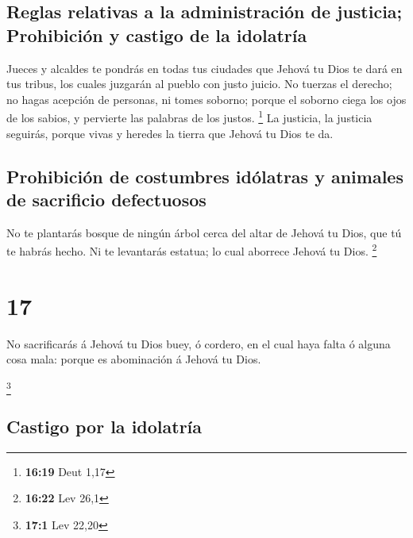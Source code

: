 \hypertarget{reglas-relativas-a-la-administraciuxf3n-de-justicia-prohibiciuxf3n-y-castigo-de-la-idolatruxeda}{%
\subsection{Reglas relativas a la administración de justicia;
Prohibición y castigo de la
idolatría}\label{reglas-relativas-a-la-administraciuxf3n-de-justicia-prohibiciuxf3n-y-castigo-de-la-idolatruxeda}}

 Jueces y alcaldes te pondrás en todas tus ciudades que
Jehová tu Dios te dará en tus tribus, los cuales juzgarán al pueblo con
justo juicio.  No tuerzas el derecho; no hagas acepción
de personas, ni tomes soborno; porque el soborno ciega los ojos de los
sabios, y pervierte las palabras de los justos. \footnote{\textbf{16:19}
  Deut 1,17}  La justicia, la justicia seguirás, porque
vivas y heredes la tierra que Jehová tu Dios te da.

\hypertarget{prohibiciuxf3n-de-costumbres-iduxf3latras-y-animales-de-sacrificio-defectuosos}{%
\subsection{Prohibición de costumbres idólatras y animales de sacrificio
defectuosos}\label{prohibiciuxf3n-de-costumbres-iduxf3latras-y-animales-de-sacrificio-defectuosos}}

 No te plantarás bosque de ningún árbol cerca del altar
de Jehová tu Dios, que tú te habrás hecho.  Ni te
levantarás estatua; lo cual aborrece Jehová tu Dios. \footnote{\textbf{16:22}
  Lev 26,1}

\hypertarget{section-16}{%
\section{17}\label{section-16}}

 No sacrificarás á Jehová tu Dios buey, ó cordero, en el
cual haya falta ó alguna cosa mala: porque es abominación á Jehová tu
Dios.

\footnote{\textbf{17:1} Lev 22,20}

\hypertarget{castigo-por-la-idolatruxeda}{%
\subsection{Castigo por la
idolatría}\label{castigo-por-la-idolatruxeda}}

